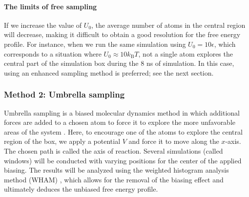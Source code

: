 \documentclass[9pt,tutorial]{livecoms}
\begin{document}
\paragraph{The limits of free sampling}
If we increase the value of $U_0$, the average number of atoms in the central region will decrease, making it difficult to obtain a good resolution for the free energy profile. For instance, when we run the same simulation using $U_0 = 10 \epsilon$, which corresponds to a situation where $U_0 \approx 10 k_\text{B} T$, not a single atom explores the central part of the simulation box during the 8 ns of simulation. In this case, using an enhanced sampling method is preferred; see the next section.

\subsubsection{Method 2: Umbrella sampling}
Umbrella sampling is a biased molecular dynamics method in which additional forces are added to a chosen atom to force it to explore the more unfavorable areas of the system \cite{kastner2011umbrella, allen2017computer, frenkel2023understanding}. Here, to encourage one of the atoms to explore the central region of the box, we apply a potential $V$ and force it to move along the $x$-axis. The chosen path is called the axis of reaction. Several simulations (called windows) will be conducted with varying positions for the center of the applied biasing. The results will be analyzed using the weighted histogram analysis method (WHAM) \cite{kumar1992weighted}, which allows for the removal of the biasing effect and ultimately deduces the unbiased free energy profile.
\end{document}
